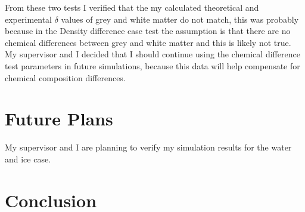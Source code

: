 \documentclass[9pt, a4paper]{article}
\begin{document}
From these two tests I verified that the my calculated theoretical and experimental $\delta$ values of grey and white matter do not match, this was probably because in the Density difference case test the assumption is that there are no chemical differences between grey and white matter and this is likely not true. 
My supervisor and I decided that I should continue using the chemical difference test parameters in future simulations, because this data will help compensate for chemical composition differences.

\section{Future Plans}


My supervisor and I are planning to verify my simulation results for the water and ice case.





\section{Conclusion}



\end{document}
